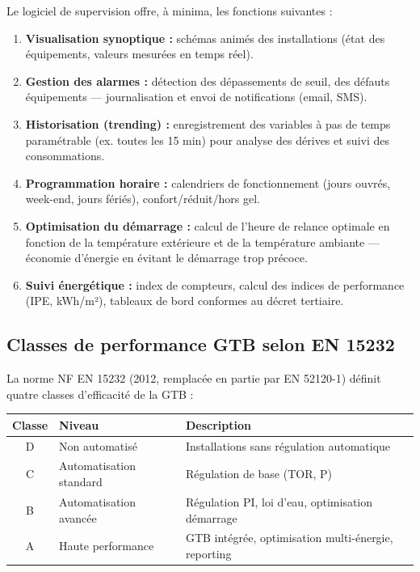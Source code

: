 Le logiciel de supervision offre, à minima, les fonctions suivantes :

\begin{enumerate}
  \item \textbf{Visualisation synoptique :} schémas animés des installations (état des équipements, valeurs mesurées en temps réel).
  \item \textbf{Gestion des alarmes :} détection des dépassements de seuil, des défauts équipements — journalisation et envoi de notifications (email, SMS).
  \item \textbf{Historisation (trending) :} enregistrement des variables à pas de temps paramétrable (ex. toutes les 15 min) pour analyse des dérives et suivi des consommations.
  \item \textbf{Programmation horaire :} calendriers de fonctionnement (jours ouvrés, week-end, jours fériés), confort/réduit/hors gel.
  \item \textbf{Optimisation du démarrage :} calcul de l'heure de relance optimale en fonction de la température extérieure et de la température ambiante — économie d'énergie en évitant le démarrage trop précoce.
  \item \textbf{Suivi énergétique :} index de compteurs, calcul des indices de performance (IPE, kWh/m²), tableaux de bord conformes au décret tertiaire.
\end{enumerate}

\subsection{Classes de performance GTB selon EN 15232}

La norme NF EN 15232 (2012, remplacée en partie par EN 52120-1) définit quatre classes d'efficacité de la GTB :

\begin{center}
\begin{tabular}{cll}
  \toprule
  Classe & Niveau & Description \\
  \midrule
  D & Non automatisé & Installations sans régulation automatique \\
  C & Automatisation standard & Régulation de base (TOR, P) \\
  B & Automatisation avancée & Régulation PI, loi d'eau, optimisation démarrage \\
  A & Haute performance & GTB intégrée, optimisation multi-énergie, reporting \\
  \bottomrule
\end{tabular}
\end{center}

